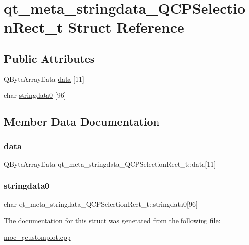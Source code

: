 \hypertarget{structqt__meta__stringdata__QCPSelectionRect__t}{}\section{qt\+\_\+meta\+\_\+stringdata\+\_\+\+Q\+C\+P\+Selection\+Rect\+\_\+t Struct Reference}
\label{structqt__meta__stringdata__QCPSelectionRect__t}
\subsection*{Public Attributes}
\begin{DoxyCompactItemize}
\item 
Q\+Byte\+Array\+Data \mbox{\hyperlink{structqt__meta__stringdata__QCPSelectionRect__t_aa58583b159c4713d8ea71032fddcc13f}{data}} \mbox{[}11\mbox{]}
\item 
char \mbox{\hyperlink{structqt__meta__stringdata__QCPSelectionRect__t_a39a87de1040c403f0ba00fdaedecbb79}{stringdata0}} \mbox{[}96\mbox{]}
\end{DoxyCompactItemize}


\subsection{Member Data Documentation}
\mbox{\label{structqt__meta__stringdata__QCPSelectionRect__t_aa58583b159c4713d8ea71032fddcc13f}} 
\subsubsection{\texorpdfstring{data}{data}}
{\footnotesize\ttfamily Q\+Byte\+Array\+Data qt\+\_\+meta\+\_\+stringdata\+\_\+\+Q\+C\+P\+Selection\+Rect\+\_\+t\+::data\mbox{[}11\mbox{]}}

\mbox{\label{structqt__meta__stringdata__QCPSelectionRect__t_a39a87de1040c403f0ba00fdaedecbb79}} 
\subsubsection{\texorpdfstring{stringdata0}{stringdata0}}
{\footnotesize\ttfamily char qt\+\_\+meta\+\_\+stringdata\+\_\+\+Q\+C\+P\+Selection\+Rect\+\_\+t\+::stringdata0\mbox{[}96\mbox{]}}



The documentation for this struct was generated from the following file\+:\begin{DoxyCompactItemize}
\item 
\mbox{\hyperlink{moc__qcustomplot_8cpp}{moc\+\_\+qcustomplot.\+cpp}}\end{DoxyCompactItemize}
